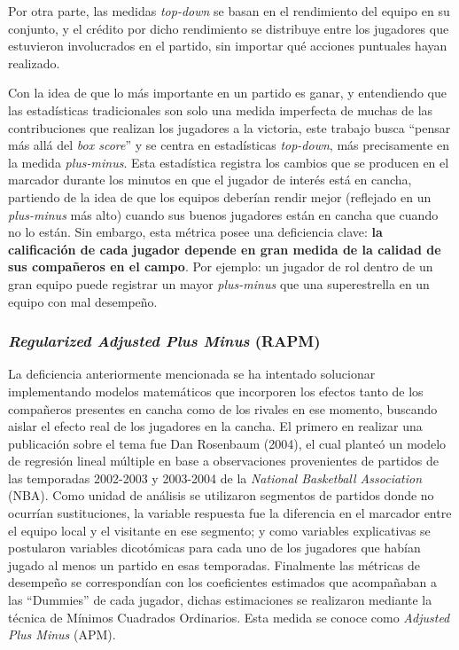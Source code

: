 \documentclass[
  12pt,
]{article}
\begin{document}
Por otra parte, las medidas \emph{top-down} se basan en el rendimiento
del equipo en su conjunto, y el crédito por dicho rendimiento se
distribuye entre los jugadores que estuvieron involucrados en el
partido, sin importar qué acciones puntuales hayan realizado.

Con la idea de que lo más importante en un partido es ganar, y
entendiendo que las estadísticas tradicionales son solo una medida
imperfecta de muchas de las contribuciones que realizan los jugadores a
la victoria, este trabajo busca ``pensar más allá del \emph{box score}''
y se centra en estadísticas \emph{top-down}, más precisamente en la
medida \emph{plus-minus}. Esta estadística registra los cambios que se
producen en el marcador durante los minutos en que el jugador de interés
está en cancha, partiendo de la idea de que los equipos deberían rendir
mejor (reflejado en un \emph{plus-minus} más alto) cuando sus buenos
jugadores están en cancha que cuando no lo están. Sin embargo, esta
métrica posee una deficiencia clave: \textbf{la calificación de cada
jugador depende en gran medida de la calidad de sus compañeros en el
campo}. Por ejemplo: un jugador de rol dentro de un gran equipo puede
registrar un mayor \emph{plus-minus} que una superestrella en un equipo
con mal desempeño.

\subsubsection*{\texorpdfstring{\emph{Regularized Adjusted Plus Minus}
(RAPM)}{Regularized Adjusted Plus Minus (RAPM)}}\label{regularized-adjusted-plus-minus-rapm}

La deficiencia anteriormente mencionada se ha intentado solucionar
implementando modelos matemáticos que incorporen los efectos tanto de
los compañeros presentes en cancha como de los rivales en ese momento,
buscando aislar el efecto real de los jugadores en la cancha. El primero
en realizar una publicación sobre el tema fue Dan Rosenbaum (2004), el
cual planteó un modelo de regresión lineal múltiple en base a
observaciones provenientes de partidos de las temporadas 2002-2003 y
2003-2004 de la \emph{National Basketball Association} (NBA). Como
unidad de análisis se utilizaron segmentos de partidos donde no ocurrían
sustituciones, la variable respuesta fue la diferencia en el marcador
entre el equipo local y el visitante en ese segmento; y como variables
explicativas se postularon variables dicotómicas para cada uno de los
jugadores que habían jugado al menos un partido en esas temporadas.
Finalmente las métricas de desempeño se correspondían con los
coeficientes estimados que acompañaban a las ``Dummies'' de cada
jugador, dichas estimaciones se realizaron mediante la técnica de
Mínimos Cuadrados Ordinarios. Esta medida se conoce como \emph{Adjusted
Plus Minus} (APM).
\end{document}
